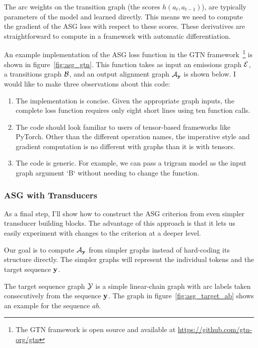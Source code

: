 The arc weights on the transition graph (the scores $h(a_t, a_{t-1})$), are
typically parameters of the model and learned directly. This means we need to
compute the gradient of the ASG loss with respect to these scores. These
derivatives are straightforward to compute in a framework with automatic
differentiation.



An example implementation of the ASG loss function in the GTN
framework~\footnote{The GTN framework is open source and available at
\url{https://github.com/gtn-org/gtn}} is shown in figure~\ref{fig:asg_gtn}.
This function takes as input an emissions graph $\mathcal{E}$, a transitions graph
$\mathcal{B}$, and an output alignment graph $\mathcal{A}_{\bf y}$ is shown below. I would like to
make three observations about this code:

\begin{enumerate}
    \item The implementation is concise. Given the appropriate graph inputs,
        the complete loss function requires only eight short lines using ten
        function calls.

    \item The code should look familiar to users of tensor-based frameworks
        like PyTorch. Other than the different operation names, the imperative
        style and gradient computation is no different with graphs than it is
        with tensors.

    \item The code is generic. For example, we can pass a trigram model as the
        input graph argument `B` without needing to change the function.
\end{enumerate}

\subsubsection{ASG with Transducers}

As a final step, I'll show how to construct the ASG criterion from even simpler
transducer building blocks. The advantage of this approach is that it lets us
easily experiment with changes to the criterion at a deeper level.

Our goal is to compute $\mathcal{A}_{\bf y}$ from simpler graphs instead of hard-coding its
structure directly. The simpler graphs will represent the individual tokens and
the target sequence ${\bf y}$.

The target sequence graph $\mathcal{Y}$ is a simple linear-chain graph with arc labels
taken consecutively from the sequence ${\bf y}$. The graph in
figure~\ref{fig:asg_target_ab} shows an example for the sequence $ab$.

